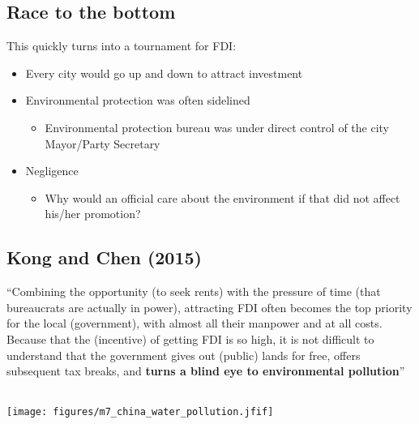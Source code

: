 \documentclass[
]{article}
\providecommand{\tightlist}{%
  \setlength{\itemsep}{0pt}\setlength{\parskip}{0pt}}
\begin{document}
\hypertarget{race-to-the-bottom}{%
\subsection{Race to the bottom}\label{race-to-the-bottom}}

This quickly turns into a tournament for FDI:

\begin{itemize}
\tightlist
\item
  Every city would go up and down to attract investment
\item
  Environmental protection was often sidelined

  \begin{itemize}
  \tightlist
  \item
    Environmental protection bureau was under direct control of the city
    Mayor/Party Secretary
  \end{itemize}
\item
  Negligence

  \begin{itemize}
  \tightlist
  \item
    Why would an official care about the environment if that did not
    affect his/her promotion?
  \end{itemize}
\end{itemize}

\hypertarget{kong-and-chen-2015}{%
\subsection{Kong and Chen (2015)}\label{kong-and-chen-2015}}

``Combining the opportunity (to seek rents) with the pressure of time
(that bureaucrats are actually in power), attracting FDI often becomes
the top priority for the local (government), with almost all their
manpower and at all costs. Because that the (incentive) of getting FDI
is so high, it is not difficult to understand that the government gives
out (public) lands for free, offers subsequent tax breaks, and
\textbf{turns a blind eye to environmental pollution}''

\hypertarget{section-4}{%
\subsection{}\label{section-4}}

\texttt{[image: figures/m7\_china\_water\_pollution.jfif]}

\hypertarget{section-5}{%
\subsection{}\label{section-5}}
\end{document}
